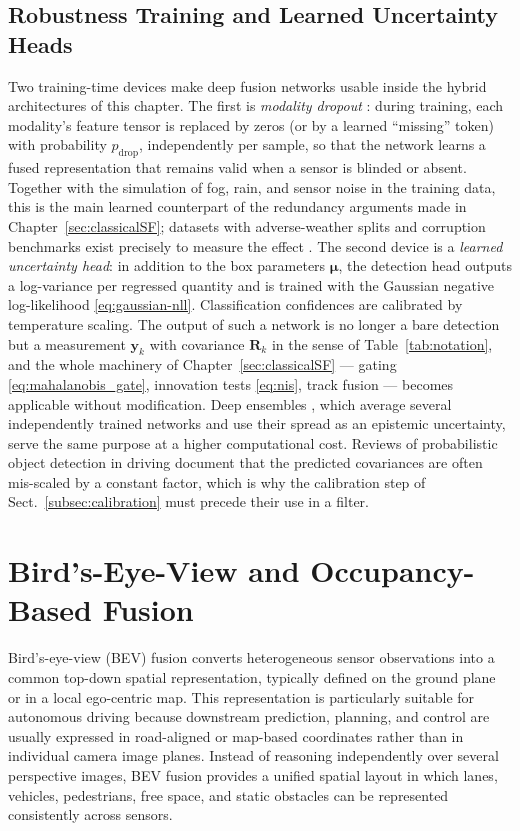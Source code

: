 \subsection{Robustness Training and Learned Uncertainty Heads}
\label{subsec:robustness-uncertainty-heads}
Two training-time devices make deep fusion networks usable inside the hybrid architectures of this chapter. The first is \emph{modality dropout} \cite{neverova2016_moddrop}: during training, each modality's feature tensor is replaced by zeros (or by a learned ``missing'' token) with probability $p_{\mathrm{drop}}$, independently per sample, so that the network learns a fused representation that remains valid when a sensor is blinded or absent. Together with the simulation of fog, rain, and sensor noise in the training data, this is the main learned counterpart of the redundancy arguments made in Chapter~\ref{sec:classicalSF}; datasets with adverse-weather splits and corruption benchmarks exist precisely to measure the effect \cite{bijelic2020_stf,dong2023_robobev}. The second device is a \emph{learned uncertainty head}: in addition to the box parameters $\boldsymbol{\mu}$, the detection head outputs a log-variance per regressed quantity and is trained with the Gaussian negative log-likelihood \eqref{eq:gaussian-nll}. Classification confidences are calibrated by temperature scaling. The output of such a network is no longer a bare detection but a measurement $\mathbf{y}_k$ with covariance $\mathbf{R}_k$ in the sense of Table~\ref{tab:notation}, and the whole machinery of Chapter~\ref{sec:classicalSF} --- gating \eqref{eq:mahalanobis_gate}, innovation tests \eqref{eq:nis}, track fusion --- becomes applicable without modification. Deep ensembles \cite{lakshminarayanan2017_ensembles}, which average several independently trained networks and use their spread as an epistemic uncertainty, serve the same purpose at a higher computational cost. Reviews of probabilistic object detection in driving \cite{feng2021_probabilistic_od} document that the predicted covariances are often mis-scaled by a constant factor, which is why the calibration step of Sect.~\ref{subsec:calibration} must precede their use in a filter.

\section{Bird's-Eye-View and Occupancy-Based Fusion}

%

Bird's-eye-view (BEV) fusion converts heterogeneous sensor observations into a common top-down spatial representation, typically defined on the ground plane or in a local ego-centric map. This representation is particularly suitable for autonomous driving because downstream prediction, planning, and control are usually expressed in road-aligned or map-based coordinates rather than in individual camera image planes. Instead of reasoning independently over several perspective images, BEV fusion provides a unified spatial layout in which lanes, vehicles, pedestrians, free space, and static obstacles can be represented consistently across sensors.

